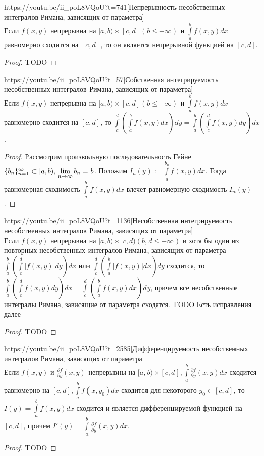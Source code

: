 \begin{linkthm}{https://youtu.be/ii_poL8VQoU?t=741}[Непрерывность несобственных интегралов Римана, зависящих от параметра]\ \\
	Если $f(x,y)$ непрерывна на $[a,b)\times[c,d](b\leqslant+\infty)$ и $\int\limits_a^b f(x,y)dx$ равномерно сходится на $[c,d]$, то он является непрерывной функцией на $[c,d]$.
\end{linkthm}
\begin{proof}
	TODO
\end{proof}


\begin{linkthm}{https://youtu.be/ii_poL8VQoU?t=57}[Собственная интегрируемость несобственных интегралов Римана, зависящих от параметра]\ \\
	Если $f(x,y)$ непрерывна на $[a,b)\times[c,d](b\leqslant+\infty)$ и $\int\limits_a^b f(x,y)dx$ равномерно сходится на $[c,d]$, то $\int\limits_c^d\left(\int\limits_a^b f(x,y)dx\right)dy=\int\limits_a^b\left(\int\limits_c^d f(x,y)dy\right)dx$.
\end{linkthm}
\begin{proof}
	Рассмотрим произвольную последовательность Гейне $\{b_n\}_{n=1}^\infty\subset[a,b),\\ \lim\limits_{n\to\infty}b_n=b$. Положим $I_n(y):=\int\limits_a^{b_n}f(x,y)dx$. Тогда равномерная сходимость $\int\limits_a^b f(x,y)dx$ влечет равномерную сходимость $I_n(y)$.
\end{proof}

\begin{linkthm}{https://youtu.be/ii_poL8VQoU?t=1136}[Несобственная интегрируемость несобственных интегралов Римана, зависящих от параметра]\ \\
	Если $f(x,y)$ непрерывна на $[a,b)\times[c,d)(b,d\leqslant+\infty)$ и хотя бы один из повторных несобственных интегралов Римана, зависящих от параметра $\int\limits_a^b\left(\int\limits_c^d |f(x,y)|dy\right)dx$ или $\int\limits_c^d\left(\int\limits_a^b |f(x,y)|dx\right)dy$ сходится, то $\int\limits_a^b\left(\int\limits_c^d f(x,y)dy\right)dx=\int\limits_c^d\left(\int\limits_a^b f(x,y)dx\right)dy$, причем все несобственные интегралы Римана, зависящие от параметра сходятся. TODO Есть исправления далее
\end{linkthm}
\begin{proof}
	TODO
\end{proof}

\begin{linkthm}{https://youtu.be/ii_poL8VQoU?t=2585}[Дифференцируемость несобственных интегралов Римана, зависящих от параметра]\ \\
	Если $f(x,y)$ и $\frac{\partial f}{\partial y}(x,y)$ непрерывны на $[a,b)\times[c,d], \int\limits_a^b\frac{\partial f}{\partial y}(x,y)dx$ сходится равномерно на $[c,d], \int\limits_a^bf(x,y_0)dx$ сходится для некоторого $y_0\in [c,d]$, то $I(y)=\int\limits_a^bf(x,y)dx$ сходится и является дифференцируемой функцией на $[c,d]$, причем
	$I'(y)=\int\limits_a^b\frac{\partial f}{\partial y}(x,y)dx$.
\end{linkthm}
\begin{proof}
	TODO
\end{proof}


